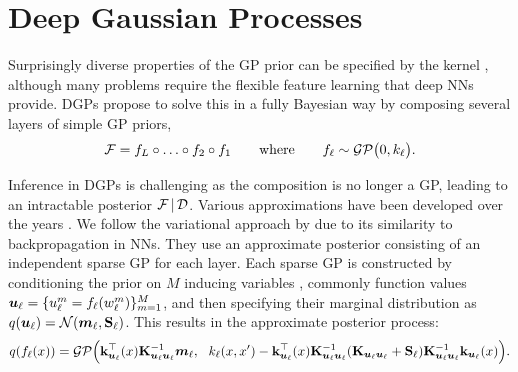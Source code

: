 
\section{Deep Gaussian Processes}
\label{section:dgps}

Surprisingly diverse properties of the GP prior can be specified by the kernel \citep{rasmussen2006,duvenaud2013structure,wilson2013gaussian,ginsbourger2013kernels,vanderwilk2018invariances}, although many problems require the flexible feature learning that deep NNs provide. DGPs \citep{Damianou2013} propose to solve this in a fully Bayesian way by composing several layers of simple GP priors,
\begin{equation}
    \mathcal{F} = f_L \circ \ldots \circ f_2 \circ f_1\qquad\text{where}\qquad
        f_\ell \sim \mathcal{GP}\big(0, k_\ell\big).
\end{equation}

Inference in DGPs is challenging as the composition is no longer a GP, leading to an intractable posterior $\mathcal{F} \,|\, \mathcal{D}$.  Various approximations have been developed over the years \citep{Damianou2013,hensman2014nested,bui2019dgpep,havasi2018inference}. We follow the variational approach by \citet{salimbeni2017doubly} due to its similarity to backpropagation in NNs. They use an approximate posterior consisting of an independent sparse GP for each layer. Each sparse GP is constructed by conditioning the prior on $M$ inducing variables \citep{titsias2009,hensman2013,matthews16}, commonly function values $\bm{u}_\ell = \{u^m_\ell = f_\ell(w_\ell^m)\}_{m=1}^M$, and then specifying their marginal distribution as $q(\vu_\ell) = \NormDist{\vm_\ell, \MS_\ell}$. This results in the approximate posterior process:
\begin{equation}
\label{eq:qf-dgp}
     q(f_\ell(x)) = \GP\Big(\kul^\top(x) \Kulul^{-1}\vm_\ell,\ \ k_\ell(x, x') -  \kul^\top(x) \Kulul^{-1} (\Kulul + \MS_\ell)\Kulul^{-1} \kul(x)\Big).
\end{equation}
%

